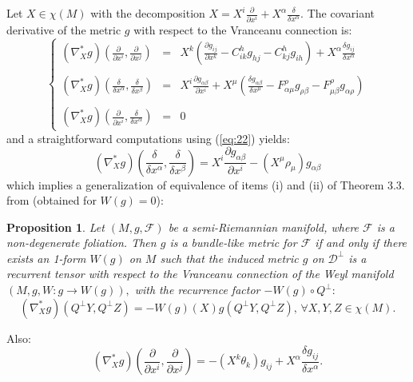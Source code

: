 \documentclass[11pt,oneside,english]{amsart}
\numberwithin{equation}{section}
\numberwithin{figure}{section}
\theoremstyle{plain}
\theoremstyle{definition}
\theoremstyle{definition}
\theoremstyle{plain}
\newtheorem{prop}[thm]{Proposition}
\theoremstyle{plain}
\theoremstyle{remark}
\theoremstyle{remark}
\begin{document}
Let $X\in\chi(M)$ with the decomposition $X=X^{i}\frac{\partial}{\partial x^{i}}+X^{\alpha}\frac{\delta}{\delta x^{\alpha}}$.
The covariant derivative of the metric $g$ with respect to the Vranceanu
connection is: \begin{equation}
\left\{ \begin{array}{llll}
(\nabla_{X}^{*}g)(\frac{\partial}{\partial x^{i}},\frac{\partial}{\partial x^{j}}) & = & X^{k}\left(\frac{\partial g_{ij}}{\partial x^{k}}-C_{ik}^{h}g_{hj}-C_{kj}^{h}g_{ih}\right)+X^{\alpha}\frac{\delta g_{ij}}{\delta x^{\alpha}}\\
\\(\nabla_{X}^{*}g)(\frac{\delta}{\delta x^{\alpha}},\frac{\delta}{\delta x^{\beta}}) & = & X^{i}\frac{\partial g_{\alpha\beta}}{\partial x^{i}}+X^{\mu}\left(\frac{\delta g_{\alpha\beta}}{\delta x^{\mu}}-F_{\alpha\mu}^{\rho}g_{\rho\beta}-F_{\mu\beta}^{\rho}g_{\alpha\rho}\right)\\
\\(\nabla_{X}^{*}g)(\frac{\partial}{\partial x^{i}},\frac{\delta}{\delta x^{\alpha}}) & = & 0\end{array}\right.\label{eq:28}\end{equation}
 and a straightforward computations using (\ref{eq:22}) yields: \begin{equation}
(\nabla_{X}^{*}g)\left(\frac{\delta}{\delta x^{\alpha}},\frac{\delta}{\delta x^{\beta}}\right)=X^{i}\frac{\partial g_{\alpha\beta}}{\partial x^{i}}-(X^{\mu}\rho_{\mu})g_{\alpha\beta}\label{eq:29}\end{equation}
 which implies a generalization of equivalence of items (i) and (ii)
of Theorem 3.3. from \cite[p. 112]{b:f} (obtained for $W(g)=0$):

\medskip{}

\begin{prop}
Let $(M,g,\mathcal{F})$ be a semi-Riemannian manifold, where $\mathcal{F}$
is a non-degenerate foliation. Then $g$ is a bundle-like metric for
$\mathcal{F}$ if and only if there exists an 1-form $W(g)$ on $M$
such that the induced metric $g$ on $\mathcal{D}^{\perp}$ is a recurrent
tensor with respect to the Vranceanu connection of the Weyl manifold
$(M,g,W:g\rightarrow W(g)),$ with the recurrence factor $-W(g)\circ Q^{\perp}:$
\[
(\nabla_{X}^{*}g)(Q^{\perp}Y,Q^{\perp}Z)=-W(g)(X)g(Q^{\perp}Y,Q^{\perp}Z),\,\forall X,Y,Z\in\chi(M).\]

\end{prop}
\medskip{}

Also: \begin{equation}
(\nabla_{X}^{*}g)\left(\frac{\partial}{\partial x^{i}},\frac{\partial}{\partial x^{j}}\right)=-(X^{k}\theta_{k})g_{ij}+X^{\alpha}\frac{\delta g_{ij}}{\delta x^{\alpha}}.\label{eq:30}\end{equation}
\end{document}
